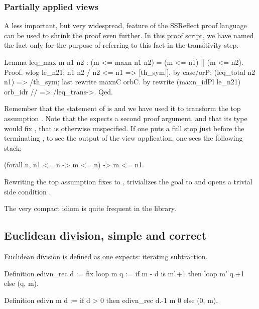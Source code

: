 \subsubsection{Partially applied views}

A less important, but very widespread, feature of the SSReflect
proof language can be used to shrink the proof even further.
In this proof script, we have named the fact  only for the
purpose of referring to this fact in the transitivity step.


\begin{coq}{}{}
Lemma leq_max m n1 n2 : (m <= maxn n1 n2) = (m <= n1) || (m <= n2).
Proof.
wlog le_n21: n1 n2 / n2 <= n1 => [th_sym|].
  by case/orP: (leq_total n2 n1) => /th_sym; last rewrite maxnC orbC.
by rewrite (maxn_idPl le_n21) orb_idr // => /leq_trans->.
Qed.
\end{coq}

Remember that the statement of
 is  and
we have used it to transform the top assumption .  Note that
the  expects a second proof argument, and that its type
would fix , that is otherwise unspecified.  If one puts a
full stop just before the terminating \C{->}, to see the output of
the view application, one sees the following stack:

\begin{coq}{}{}
(forall n, n1 <= n -> m <= n) -> m <= n1.
\end{coq}

Rewriting the top assumption fixes  to , trivializes
the goal  to  and opens a trivial side
condition .

The very compact idiom  is quite frequent in the
\mcbMC{} library.

\subsection{Euclidean division, simple and correct}\label{sec:edivn}

Euclidean division is defined as one expects: iterating subtraction.

\begin{coq}{}{}
Definition edivn_rec d :=
  fix loop m q := if m - d is m'.+1 then loop m' q.+1 else (q, m).

Definition edivn m d := if d > 0 then edivn_rec d.-1 m 0 else (0, m).
\end{coq}

